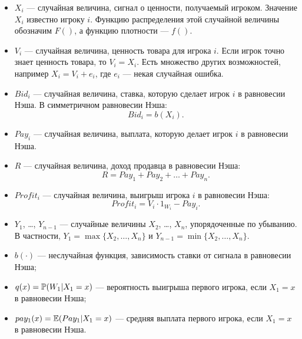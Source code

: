 \begin{itemize}
\item $ X_{i} $ — случайная величина, сигнал о ценности, получаемый игроком. Значение $ X_{i} $ известно игроку $ i $. Функцию распределения этой случайной величины обозначим $ F() $, а функцию плотности — $ f() $.

\item $ V_{i} $ — случайная величина, ценность товара для игрока $ i $. Если игрок точно знает ценность товара, то $V_{i}=X_{i}$. Есть множество других возможностей, например $X_{i}=V_{i}+e_{i}$, где $ e_{i} $ — некая случайная ошибка.

\item $Bid_{i}$ — случайная величина, ставка, которую сделает игрок $ i $ в равновесии Нэша. В симметричном равновесии Нэша:
\begin{equation}
Bid_{i}=b(X_{i}).
\end{equation}

\item $Pay_{i}$ — случайная величина, выплата, которую делает игрок $ i $ в равновесии Нэша.

\item $ R $ — случайная величина, доход продавца в равновесии Нэша:
\begin{equation}
R=Pay_{1}+Pay_{2}+\ldots+Pay_{n}.
\end{equation}

\item $Profit_{i}$ — случайная величина, выигрыш  игрока $i$ в равновесии Нэша:
\begin{equation}
Profit_{i}=V_{i}\cdot 1_{W_{i}}-Pay_{i}.
\end{equation}

\item $Y_{1}$, \ldots, $ Y_{n-1} $ — случайные величины $ X_{2} $, \ldots, $ X_{n} $, упорядоченные по убыванию. В частности, $ Y_{1}=\max\{X_{2},\ldots,X_{n}\} $ и $ Y_{n-1}=\min\{X_{2},\ldots,X_{n}\} $.

\end{itemize}


\newpage
{}

\begin{itemize}
\item $ b(\cdot ) $ — неслучайная функция, зависимость ставки от сигнала в равновесии Нэша;

\item $q(x)=\P(W_{1}|X_{1}=x)$ — вероятность выигрыша первого игрока, если $ X_{1}=x $ в равновесии Нэша;

\item $pay_{1}(x)=\E(Pay_{1}|X_{1}=x)$ — средняя выплата первого игрока, если $ X_{1}=x $ в равновесии Нэша.

\end{itemize}

